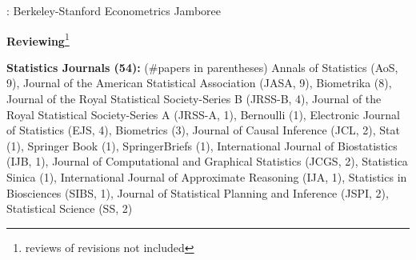 \documentclass{article}
\begin{document}
\vspace{4mm}
: Berkeley-Stanford Econometrics Jamboree
 











\vspace{7mm}
\begin{large}
\noindent \textbf{Reviewing}\footnote{reviews of revisions not included}
\end{large}

\vspace{2mm}
\noindent \textbf{Statistics Journals (54): }(\#papers in parentheses) Annals of Statistics (AoS, 9), Journal of the American Statistical Association (JASA, 9), Biometrika (8), Journal of the Royal Statistical Society-Series B (JRSS-B, 4), Journal of the Royal Statistical Society-Series A (JRSS-A, 1), Bernoulli (1), Electronic Journal of Statistics (EJS, 4), Biometrics (3), Journal of Causal Inference (JCL, 2), Stat (1), Springer Book (1), SpringerBriefs (1), International Journal of Biostatistics (IJB, 1), Journal of Computational and Graphical Statistics (JCGS, 2), Statistica Sinica (1), International Journal of Approximate Reasoning (IJA, 1), Statistics in Biosciences (SIBS, 1), Journal of Statistical Planning and Inference (JSPI, 2), Statistical Science (SS, 2)
\end{document}
